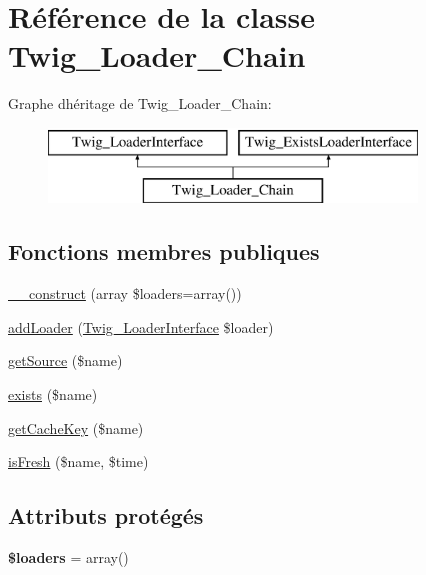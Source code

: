 \hypertarget{class_twig___loader___chain}{}\section{Référence de la classe Twig\+\_\+\+Loader\+\_\+\+Chain}
\label{class_twig___loader___chain}
Graphe d\textquotesingle{}héritage de Twig\+\_\+\+Loader\+\_\+\+Chain\+:\begin{figure}[H]
\begin{center}
\leavevmode
\includegraphics[height=2.000000cm]{class_twig___loader___chain}
\end{center}
\end{figure}
\subsection*{Fonctions membres publiques}
\begin{DoxyCompactItemize}
\item 
\hyperlink{class_twig___loader___chain_aa94b98a38dc6c45449a45212d47f1a95}{\+\_\+\+\_\+construct} (array \$loaders=array())
\item 
\hyperlink{class_twig___loader___chain_a7ad8b56cdbaec221cb1b1e2a991cda8c}{add\+Loader} (\hyperlink{interface_twig___loader_interface}{Twig\+\_\+\+Loader\+Interface} \$loader)
\item 
\hyperlink{class_twig___loader___chain_a8c6017d8ed0800a8d6b201883fcfb4bd}{get\+Source} (\$name)
\item 
\hyperlink{class_twig___loader___chain_a0909de156d39accf2e3c52f4bce3765f}{exists} (\$name)
\item 
\hyperlink{class_twig___loader___chain_aaf1587bcc7c8f06e87be6ccaf76fb6ea}{get\+Cache\+Key} (\$name)
\item 
\hyperlink{class_twig___loader___chain_a3ee0419b212dc4f6f1e8a5a615423ad8}{is\+Fresh} (\$name, \$time)
\end{DoxyCompactItemize}
\subsection*{Attributs protégés}
\begin{DoxyCompactItemize}
\item 
{\bfseries \$loaders} = array()\hypertarget{class_twig___loader___chain_ade57fa58e6103ea68f43451f7232ec11}{}\label{class_twig___loader___chain_ade57fa58e6103ea68f43451f7232ec11}

\end{DoxyCompactItemize}


